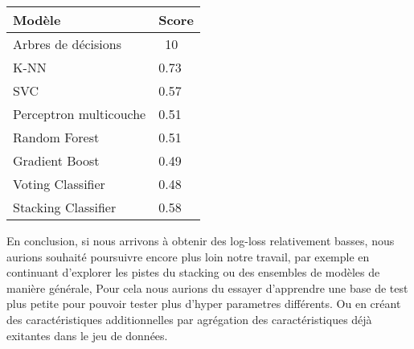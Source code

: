 \documentclass[twocolumn,10pt]{article}
\begin{document}
\begin{center}
\begin{tabular}{|l|l|}
    \hline
    Modèle &  Score \tabularnewline
    \hline
    Arbres de décisions & ~10  \tabularnewline
    \hline
    K-NN & 0.73  \tabularnewline
    \hline
    SVC & 0.57  \tabularnewline
    \hline
    Perceptron multicouche & 0.51  \tabularnewline
    \hline
    Random Forest & 0.51  \tabularnewline
    \hline
    Gradient Boost & 0.49  \tabularnewline
    \hline
    Voting Classifier & 0.48  \tabularnewline
    \hline
    Stacking Classifier & 0.58   \tabularnewline
    \hline
 \end{tabular}
 \end{center}

En conclusion, si nous arrivons à obtenir des log-loss relativement basses, nous aurions souhaité poursuivre encore plus loin notre travail, par exemple en continuant d'explorer les pistes du stacking ou des ensembles de modèles de manière générale, Pour cela nous aurions du essayer d'apprendre une base de test plus petite pour pouvoir tester plus d'hyper parametres différents. Ou en créant des caractéristiques additionnelles par agrégation des caractéristiques déjà exitantes dans le jeu de données.
\end{document}
